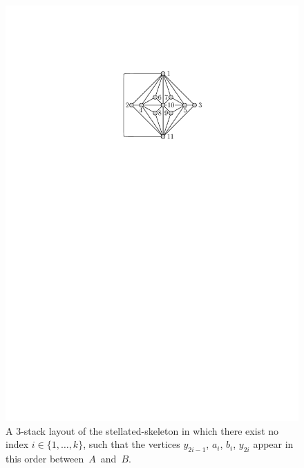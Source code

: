 \documentclass[runningheads]{llncs}
\begin{document}
\begin{figure}[t]
   \centering
   \includegraphics[width=.80\textwidth,page=9]{graphs}
   \caption{%
   A $3$-stack layout of the stellated-skeleton in which there exist no index $i\in\{1,\ldots,k\}$, such that the vertices $y_{2i-1}$, $a_{i}$, $b_{i}$, $y_{2i}$ appear in this order between~$A$~and~$B$.}
   \label{fig:c2}
\end{figure}
   
\end{document}
